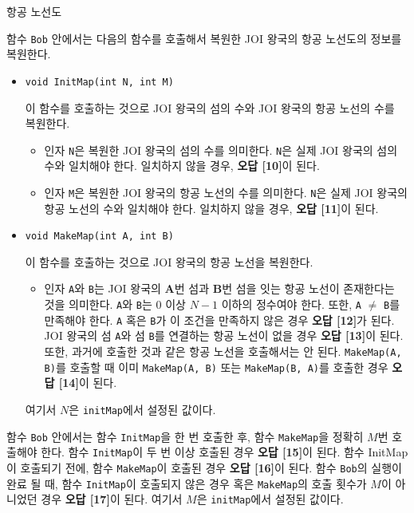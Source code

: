 \begin{problem}{항공 노선도}
\begin{itemize}
	함수 \texttt{Bob} 안에서는 다음의 함수를 호출해서 복원한 JOI 왕국의 항공 노선도의 정보를 복원한다.
	
	\begin{itemize}
		\item \texttt{void InitMap(int N, int M)}
		
		이 함수를 호출하는 것으로 JOI 왕국의 섬의 수와 JOI 왕국의 항공 노선의 수를 복원한다.
		
		\begin{itemize}
			\item 인자 \texttt{N}은 복원한 JOI 왕국의 섬의 수를 의미한다. \texttt{N}은 실제 JOI 왕국의 섬의 수와 일치해야 한다. 일치하지 않을 경우, \textbf{오답 [10]}이 된다.
			\item 인자 \texttt{M}은 복원한 JOI 왕국의 항공 노선의 수를 의미한다. \texttt{N}은 실제 JOI 왕국의 항공 노선의 수와 일치해야 한다. 일치하지 않을 경우, \textbf{오답 [11]}이 된다. 
		\end{itemize}
		
		\item \texttt{void MakeMap(int A, int B)}
		
		이 함수를 호출하는 것으로 JOI 왕국의 항공 노선을 복원한다.
		
		\begin{itemize}
			
			\item 인자 \texttt{A}와 \texttt{B}는 JOI 왕국의 \textbf{A}번 섬과 \textbf{B}번 섬을 잇는 항공 노선이 존재한다는 것을 의미한다. \texttt{A}와 \texttt{B}는 0 이상 $N-1$ 이하의 정수여야 한다. 또한, \texttt{A} $\ne$ \texttt{B}를 만족해야 한다. \texttt{A} 혹은 \texttt{B}가 이 조건을 만족하지 않은 경우 \textbf{오답 [12]}가 된다. JOI 왕국의 섬 \texttt{A}와 섬 \texttt{B}를 연결하는 항공 노선이 없을 경우 \textbf{오답 [13]}이 된다. 또한, 과거에 호출한 것과 같은 항공 노선을 호출해서는 안 된다. \texttt{MakeMap(A, B)}를 호출할 때 이미 \texttt{MakeMap(A, B)} 또는 \texttt{MakeMap(B, A)}를 호출한 경우 \textbf{오답 [14]}이 된다.
			
		\end{itemize}
		
		여기서 $N$은 \texttt{initMap}에서 설정된 값이다.
		
	\end{itemize}
		
	함수 \texttt{Bob} 안에서는 함수 \texttt{InitMap}을 한 번 호출한 후, 함수 \texttt{MakeMap}을 정확히 $M$번 호출해야 한다. 함수 \texttt{InitMap}이 두 번 이상 호출된 경우 \textbf{오답 [15]}이 된다. 함수 InitMap이 호출되기 전에, 함수 \texttt{MakeMap}이 호출된 경우 \textbf{오답 [16]}이 된다. 함수 \texttt{Bob}의 실행이 완료 될 때, 함수 \texttt{InitMap}이 호출되지 않은 경우 혹은 \texttt{MakeMap}의 호출 횟수가 $M$이 아니었던 경우 \textbf{오답 [17]}이 된다. 여기서 $M$은 \texttt{initMap}에서 설정된 값이다.
	

\end{itemize}
\end{problem}
